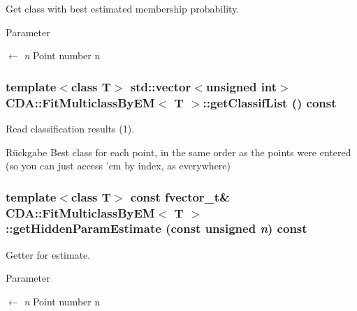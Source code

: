 Get class with best estimated membership probability. 


\begin{DoxyParams}{Parameter}
\item[\mbox{$\leftarrow$} {\em n}]Point number n \end{DoxyParams}
\hypertarget{classCDA_1_1FitMulticlassByEM_a967f5380f84a679ca07f1fd9ac1a9e65}{
\subsubsection[{getClassifList}]{\setlength{\rightskip}{0pt plus 5cm}template$<$class T$>$ std::vector$<$unsigned int$>$ {\bf CDA::FitMulticlassByEM}$<$ T $>$::getClassifList () const}}
\label{classCDA_1_1FitMulticlassByEM_a967f5380f84a679ca07f1fd9ac1a9e65}


Read classification results (1). 

\begin{DoxyReturn}{Rückgabe}
Best class for each point, in the same order as the points were entered (so you can just access 'em by index, as everywhere) 
\end{DoxyReturn}
\hypertarget{classCDA_1_1FitMulticlassByEM_a62588d5a6dcc8bc7af432b26ee5be5ab}{
\subsubsection[{getHiddenParamEstimate}]{\setlength{\rightskip}{0pt plus 5cm}template$<$class T$>$ const fvector\_\-t\& {\bf CDA::FitMulticlassByEM}$<$ T $>$::getHiddenParamEstimate (const unsigned {\em n}) const}}
\label{classCDA_1_1FitMulticlassByEM_a62588d5a6dcc8bc7af432b26ee5be5ab}


Getter for estimate. 


\begin{DoxyParams}{Parameter}
\item[\mbox{$\leftarrow$} {\em n}]Point number n \end{DoxyParams}


